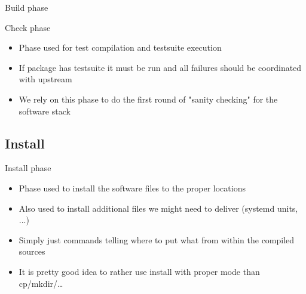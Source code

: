 \documentclass{beamer}
\begin{document}
\begin{frame}[fragile]{Build phase}
\end{frame}

\begin{frame}[t]{Check phase}
	\begin{itemize}
	\item Phase used for test compilation and testsuite execution
    \item If package has testsuite it must be run and all failures should be coordinated with upstream
    \item We rely on this phase to do the first round of "sanity checking" for the software stack
	\end{itemize}
\end{frame}

\subsection{Install}

\begin{frame}[t]{Install phase}
	\begin{itemize}
	\item Phase used to install the software files to the proper locations
    \item Also used to install additional files we might need to deliver (systemd units, ...)
    \item Simply just commands telling where to put what from within the compiled sources
    \item It is pretty good idea to rather use install with proper mode than cp/mkdir/\ldots
	\end{itemize}
\end{frame}
\end{document}
